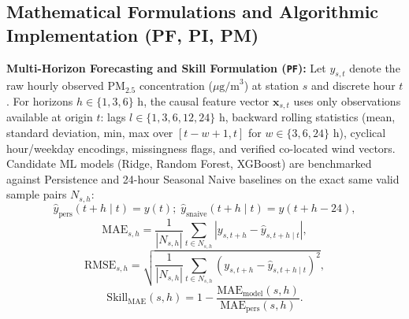 \subsection{Mathematical Formulations and Algorithmic Implementation (PF, PI, PM)}
\textbf{Multi-Horizon Forecasting and Skill Formulation (\texttt{PF}):} Let $y_{s,t}$ denote the raw hourly observed $\text{PM}_{2.5}$ concentration ($\mu\text{g/m}^3$) at station $s$ and discrete hour $t$. For horizons $h \in \{1, 3, 6\}\text{ h}$, the causal feature vector $\mathbf{x}_{s,t}$ uses only observations available at origin $t$: lags $l \in \{1, 3, 6, 12, 24\}\text{ h}$, backward rolling statistics (mean, standard deviation, min, max over $[t-w+1, t]$ for $w \in \{3, 6, 24\}\text{ h}$), cyclical hour/weekday encodings, missingness flags, and verified co-located wind vectors. Candidate ML models (Ridge, Random Forest, XGBoost) are benchmarked against Persistence and 24-hour Seasonal Naive baselines on the exact same valid sample pairs $N_{s,h}$:
\begin{equation}
\hat{y}_{\text{pers}}(t+h \mid t) = y(t); \; \hat{y}_{\text{snaive}}(t+h \mid t) = y(t+h-24),
\end{equation}
\begin{equation}
\text{MAE}_{s,h} = \frac{1}{|N_{s,h}|} \sum_{t \in N_{s,h}} |y_{s,t+h} - \hat{y}_{s,t+h \mid t}|,
\end{equation}
\begin{equation}
\text{RMSE}_{s,h} = \sqrt{\frac{1}{|N_{s,h}|} \sum_{t \in N_{s,h}} (y_{s,t+h} - \hat{y}_{s,t+h \mid t})^2},
\end{equation}
\begin{equation}
\text{Skill}_{\text{MAE}}(s,h) = 1 - \frac{\text{MAE}_{\text{model}}(s,h)}{\text{MAE}_{\text{pers}}(s,h)}.
\end{equation}

